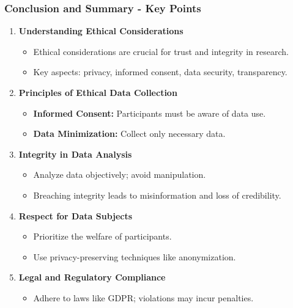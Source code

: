 \documentclass[aspectratio=169]{beamer}
\begin{document}
\begin{frame}[fragile]
    \frametitle{Conclusion and Summary - Key Points}
    \begin{enumerate}
        \item \textbf{Understanding Ethical Considerations}
        \begin{itemize}
            \item Ethical considerations are crucial for trust and integrity in research.
            \item Key aspects: privacy, informed consent, data security, transparency.
        \end{itemize}

        \item \textbf{Principles of Ethical Data Collection}
        \begin{itemize}
            \item \textbf{Informed Consent:} Participants must be aware of data use.
            \item \textbf{Data Minimization:} Collect only necessary data.
        \end{itemize}
        
        \item \textbf{Integrity in Data Analysis}
        \begin{itemize}
            \item Analyze data objectively; avoid manipulation.
            \item Breaching integrity leads to misinformation and loss of credibility.
        \end{itemize}
        
        \item \textbf{Respect for Data Subjects}
        \begin{itemize}
            \item Prioritize the welfare of participants.
            \item Use privacy-preserving techniques like anonymization.
        \end{itemize}

        \item \textbf{Legal and Regulatory Compliance}
        \begin{itemize}
            \item Adhere to laws like GDPR; violations may incur penalties.
        \end{itemize}
    \end{enumerate}
\end{frame}
\end{document}

